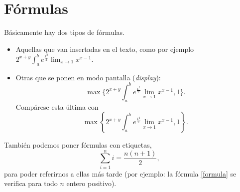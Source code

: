 \chapter{Fórmulas}

Básicamente hay dos tipos de fórmulas.
\begin{itemize}
\item Aquellas que van insertadas en el texto, como por ejemplo $2^{x+y}\int_a^b e^{\frac{x^2}{2}}\lim_{x\to 1}x^{x-1}$.
\item Otras que se ponen en modo pantalla (\emph{display}): \[\max\{2^{x+y}\int_a^b e^{\frac{x^2}{2}}\lim_{x\to 1}x^{x-1},1\}.\]
Compárese esta última con 
\[\max\left\{2^{x+y}\int_a^b e^{\frac{x^2}{2}}\lim_{x\to 1}x^{x-1},1\right\}.\]
\end{itemize}

También podemos poner fórmulas con etiquetas,
\begin{equation}\label{formula} %
\sum_{i=1}^n i=\frac{n(n+1)}2,
\end{equation}
para poder referirnos a ellas más tarde (por ejemplo: la fórmula \ref{formula} se verifica para todo $n$ entero positivo). %
